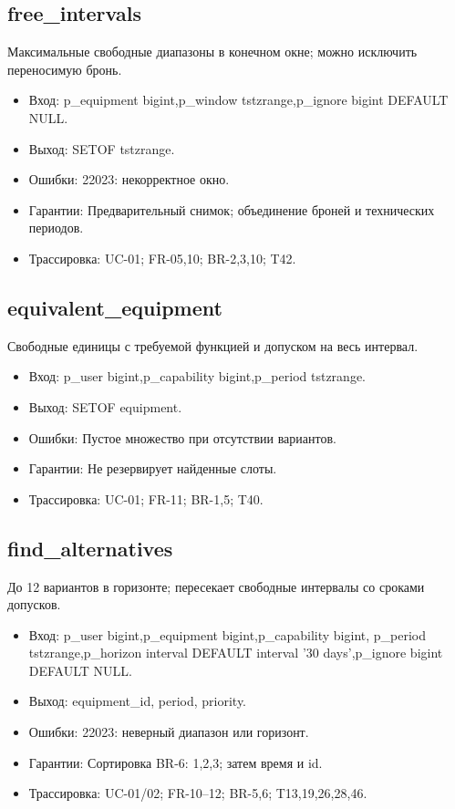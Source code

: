 \subsection{free\_\allowbreak{}intervals}
Максимальные свободные диапазоны в конечном окне; можно исключить переносимую бронь.
\begin{itemize}
\item Вход: p\_\allowbreak{}equipment bigint,p\_\allowbreak{}window tstzrange,p\_\allowbreak{}ignore bigint DEFAULT NULL.
\item Выход: SETOF tstzrange.
\item Ошибки: 22023: некорректное окно.
\item Гарантии: Предварительный снимок; объединение броней и технических периодов.
\item Трассировка: UC-01; FR-05,10; BR-2,3,10; T42.
\end{itemize}
\subsection{equivalent\_\allowbreak{}equipment}
Свободные единицы с требуемой функцией и допуском на весь интервал.
\begin{itemize}
\item Вход: p\_\allowbreak{}user bigint,p\_\allowbreak{}capability bigint,p\_\allowbreak{}period tstzrange.
\item Выход: SETOF equipment.
\item Ошибки: Пустое множество при отсутствии вариантов.
\item Гарантии: Не резервирует найденные слоты.
\item Трассировка: UC-01; FR-11; BR-1,5; T40.
\end{itemize}
\subsection{find\_\allowbreak{}alternatives}
До 12 вариантов в горизонте; пересекает свободные интервалы со сроками допусков.
\begin{itemize}
\item Вход: p\_\allowbreak{}user bigint,p\_\allowbreak{}equipment bigint,p\_\allowbreak{}capability bigint,  p\_\allowbreak{}period tstzrange,p\_\allowbreak{}horizon interval DEFAULT interval '30 days',p\_\allowbreak{}ignore bigint DEFAULT NULL.
\item Выход: equipment\_\allowbreak{}id, period, priority.
\item Ошибки: 22023: неверный диапазон или горизонт.
\item Гарантии: Сортировка BR-6: 1,2,3; затем время и id.
\item Трассировка: UC-01/\allowbreak{}02; FR-10–12; BR-5,6; T13,19,26,28,46.
\end{itemize}
